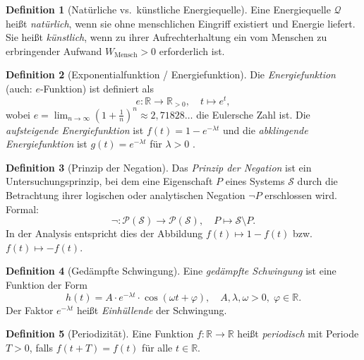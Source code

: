 ﻿\documentclass[a4paper,12pt]{article}
\theoremstyle{definition}
\newtheorem{definition}{Definition}
\begin{document}
\begin{definition}[Nat\"urliche vs.\ k\"unstliche Energiequelle]
    Eine Energiequelle $\mathcal{Q}$ hei\ss{}t \emph{nat\"urlich}, wenn sie ohne
    menschlichen Eingriff existiert und Energie liefert. Sie hei\ss{}t \emph{k\"unstlich},
    wenn zu ihrer Aufrechterhaltung ein vom Menschen zu erbringender Aufwand
    $W_{\mathrm{Mensch}} > 0$ erforderlich ist.
\end{definition}

\begin{definition}[Exponentialfunktion / Energiefunktion]
    Die \emph{Energiefunktion} (auch: $e$-Funktion) ist definiert als
    \[
        e : \mathbb{R} \to \mathbb{R}_{>0},\quad t \mapsto e^t,
    \]
    wobei $e = \lim_{n\to\infty}\left(1+\tfrac{1}{n}\right)^n \approx 2{,}71828\ldots$
    die Eulersche Zahl ist. Die \emph{aufsteigende Energiefunktion} ist
    $f(t) = 1 - e^{-\lambda t}$ und die \emph{abklingende Energiefunktion} ist
    $g(t) = e^{-\lambda t}$ f\"ur $\lambda > 0$ \cite{Abramowitz1972}.
\end{definition}

\begin{definition}[Prinzip der Negation]
    Das \emph{Prinzip der Negation} ist ein Untersuchungsprinzip, bei dem eine
    Eigenschaft $P$ eines Systems $\mathcal{S}$ durch die Betrachtung ihrer logischen
    oder analytischen Negation $\neg P$ erschlossen wird. Formal:
    \[
        \neg : \mathcal{P}(\mathcal{S}) \to \mathcal{P}(\mathcal{S}),\quad
        P \mapsto \mathcal{S} \setminus P.
    \]
    In der Analysis entspricht dies der Abbildung $f(t) \mapsto 1 - f(t)$ bzw.\
    $f(t) \mapsto -f(t)$.
\end{definition}

\begin{definition}[Ged\"ampfte Schwingung]
    Eine \emph{ged\"ampfte Schwingung} ist eine Funktion der Form
    \[
        h(t) = A \cdot e^{-\lambda t} \cdot \cos(\omega t + \varphi),
        \quad A, \lambda, \omega > 0,\; \varphi \in \mathbb{R}.
    \]
    Der Faktor $e^{-\lambda t}$ hei\ss{}t \emph{Einhüllende} der Schwingung.
\end{definition}

\begin{definition}[Periodizit\"at]
    Eine Funktion $f : \mathbb{R} \to \mathbb{R}$ hei\ss{}t \emph{periodisch} mit
    Periode $T > 0$, falls $f(t + T) = f(t)$ f\"ur alle $t \in \mathbb{R}$.
\end{definition}
\end{document}
